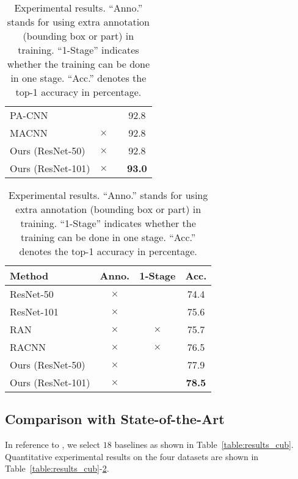 \documentclass[runningheads]{llncs}
\begin{document}
\begin{table}[p]
\begin{minipage}[p]{0.48\linewidth}
\begin{subtable}[t]{\textwidth}
\begin{tabular}{lccc}
	PA-CNN \cite{krause2015fine} & \checkmark & \checkmark & 92.8\\
	MACNN \cite{zheng2017learning} & $\times$ & \checkmark & 92.8\\
	\midrule
	Ours (ResNet-50) & $\times$ & \checkmark & 92.8\\
	Ours (ResNet-101) & $\times$ & \checkmark & \bf93.0\\
	\bottomrule
	\end{tabular}
        \caption{Stanford Cars.}
        \label{table:results_stanford_cars}
      \end{subtable}
      \begin{subtable}[b]{\textwidth}
	\begin{tabular}{lccc}
	\toprule
	Method & Anno. & 1-Stage & Acc.\\
	\midrule
	ResNet-50 \cite{he2016deep} & $\times$ & \checkmark & 74.4\\
	ResNet-101 \cite{he2016deep} & $\times$ & \checkmark & 75.6\\
	RAN \cite{wang2017residual} & $\times$ & $\times$ & 75.7\\
	RACNN \cite{fu2017look} & $\times$ & $\times$ & 76.5\\
	\midrule
	Ours (ResNet-50) & $\times$ & \checkmark & 77.9\\
	Ours (ResNet-101) & $\times$ & \checkmark & \bf78.5\\
	\bottomrule
	\end{tabular}
        \caption{Dogs-in-the-Wild.}
        \label{table:results_dogs-in-the-wild}
      \end{subtable}
      \end{minipage}
      \caption{Experimental results. ``Anno.'' stands for using extra annotation (bounding box or part) in training. ``1-Stage'' indicates whether the training can be done in one stage. ``Acc.'' denotes the top-1 accuracy in percentage.}
\end{table}


\vspace{-.1in}
\subsection{Comparison with State-of-the-Art}

In reference to \cite{fu2017look}, we select $18$ baselines as shown in Table~\ref{table:results_cub}.
Quantitative experimental results on the four datasets are shown in Table~\ref{table:results_cub}-\ref{table:results_dogs-in-the-wild}.
\end{document}
